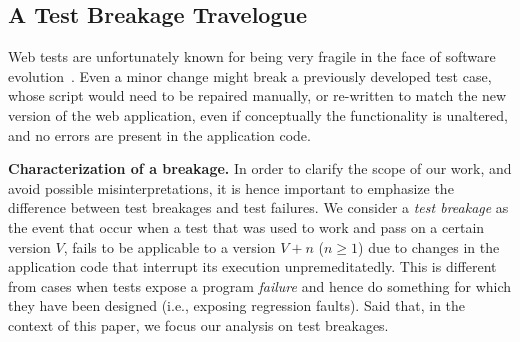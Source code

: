 \subsection{A Test Breakage Travelogue}\label{sec:breakage-travelogue}

Web tests are unfortunately known for being very fragile in the face of software evolution~\cite{2016-leotta-Advances,2016-Leotta-JSEP,Hammoudi-2016-ICST}. %
Even a minor change might break a previously developed test case, whose script would need to be repaired manually, or re-written to match the new version of the web application, even if conceptually the functionality is unaltered, and no errors are present in the application code.

\noindent
\textbf{Characterization of a breakage.}
In order to clarify the scope of our work, and avoid possible misinterpretations, it is hence important to emphasize the difference between test breakages and test failures. We consider a \textit{test breakage} as the event that occur when a test that was used to work and pass on a certain version $V$, fails to be applicable to a version $V+n$ ($n \geq 1$) due to changes in the application code that interrupt its execution unpremeditatedly. %
This is different from cases when tests expose a program \textit{failure} and hence do something for which they have been designed (i.e., exposing regression faults).
Said that, in the context of this paper, we focus our analysis on test breakages.

